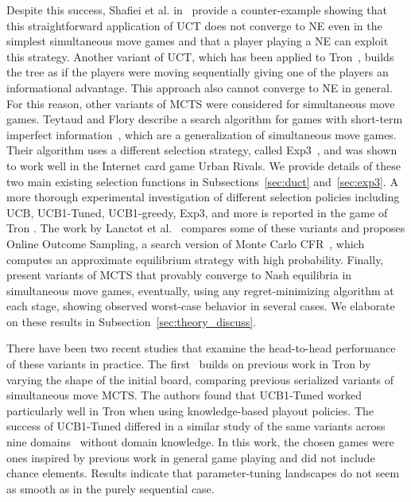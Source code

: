 Despite this success, Shafiei et al. in~\cite{Shafiei09} provide a counter-example showing that this straightforward application of UCT does not
converge to NE even in the simplest simultaneous move games and that a player playing a NE can exploit this strategy. Another variant of UCT, which has been applied to  Tron~\cite{Samothrakis10Tron}, builds the tree as if the players were moving sequentially giving one of the players an informational advantage. This approach also cannot converge to NE in general. For this reason, other variants of MCTS were considered for simultaneous move games. Teytaud and Flory describe a search algorithm for games with short-term imperfect information~\cite{Teytaud11Upper}, which are a generalization of simultaneous move games. Their algorithm uses a different selection strategy, called Exp3~\cite{Auer2003Exp3},
and was shown to work well in the Internet card game Urban Rivals. We provide details of these two main existing selection functions in Subsections~\ref{sec:duct} and~\ref{sec:exp3}.
A more thorough experimental investigation of different selection policies including UCB, UCB1-Tuned, UCB1-greedy, Exp3, and more is reported in the game of Tron \cite{Perick12Comparison}. The work by Lanctot et al.~\cite{Lanctot13Goofspiel} compares some of these variants and proposes Online Outcome Sampling, a search version of Monte Carlo CFR~\cite{Lanctot09Sampling}, which computes an approximate equilibrium strategy with high probability. 
Finally, \cite{lisy2013-nips,Kovarik2015Analysis} present variants of MCTS that provably converge to Nash equilibria in simultaneous move games, eventually, 
using any regret-minimizing algorithm at each stage, showing observed worst-case behavior in several cases. We elaborate on these results in Subsection~\ref{sec:theory_discuss}.

There have been two recent studies that examine the head-to-head performance of these variants in practice. 
The first~\cite{Lanctot13Tron} builds on previous work in Tron by varying the shape of the initial board, 
comparing previous serialized variants of simultaneous move MCTS. The authors found that UCB1-Tuned worked 
particularly well in Tron when using knowledge-based playout policies. The success of UCB1-Tuned differed in 
a similar study of the same variants across nine domains~\cite{Tak14smmcts} without domain knowledge. In this 
work, the chosen games were ones inspired by previous work in general game playing and did not include chance elements. 
Results indicate that parameter-tuning landscapes do not seem as smooth as in the purely sequential case. 

